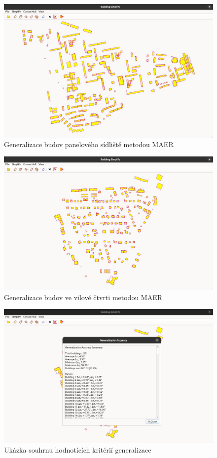 \begin{figure}[H]
    \centering
    \includegraphics[width=\textwidth]{images/Ukazaka_block.JPG}
    \caption{Generalizace budov panelového sídliště metodou MAER}
\end{figure}

\begin{figure}[H]
    \centering
    \includegraphics[width=\textwidth]{images/Ukazaka_villa_district.JPG}
    \caption{Generalizace budov ve vilové čtvrti metodou MAER}
\end{figure}

\begin{figure}[H]
    \centering
    \includegraphics[width=\textwidth]{images/Ukazka_presnost.JPG}
    \caption{Ukázka souhrnu hodnotících kritérií generalizace}
\end{figure}
